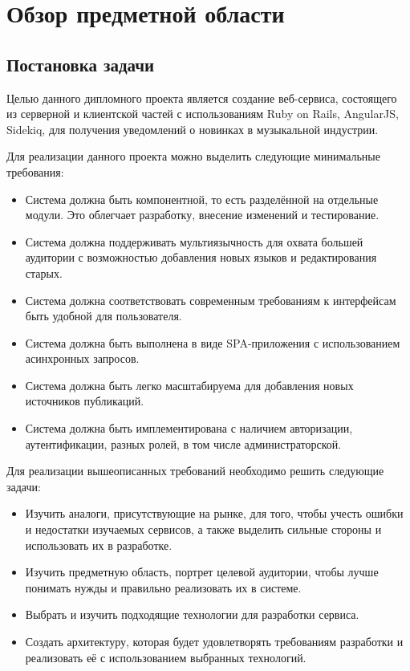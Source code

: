 \section{Обзор предметной области}
\label{sec:domain}

\subsection{Постановка задачи}
\label{sub:domain:problem_formulation}
Целью данного дипломного проекта является создание веб-сервиса, состоящего из серверной и клиентской частей с использованиям Ruby on Rails, AngularJS, Sidekiq, для получения уведомлений о новинках в музыкальной индустрии.

Для реализации данного проекта можно выделить следующие минимальные требования:

\begin{itemize}
  \item Система должна быть компонентной, то есть разделённой на отдельные модули. Это облегчает разработку, внесение изменений и тестирование.
  \item Система должна поддерживать мультиязычность для охвата большей аудитории с возможностью добавления новых языков и редактирования старых.
  \item Система должна соответствовать современным требованиям к интерфейсам быть удобной для пользователя.
  \item Система должна быть выполнена в виде SPA-приложения с использованием асинхронных запросов.
  \item Система должна быть легко масштабируема для добавления новых источников публикаций.
  \item Система должна быть имплементирована с наличием авторизации, аутентификации, разных ролей, в том числе администраторской.
\end{itemize}

Для реализации вышеописанных требований необходимо решить следующие задачи:

\begin{itemize}
  \item Изучить аналоги, присутствующие на рынке, для того, чтобы учесть ошибки и недостатки изучаемых сервисов, а также выделить сильные стороны и использовать их в разработке.
  \item Изучить предметную область, портрет целевой аудитории, чтобы лучше понимать нужды и правильно реализовать их в системе.
  \item Выбрать и изучить подходящие технологии для разработки сервиса.
  \item Создать архитектуру, которая будет удовлетворять требованиям разработки и реализовать её с использованием выбранных технологий.
\end{itemize}

